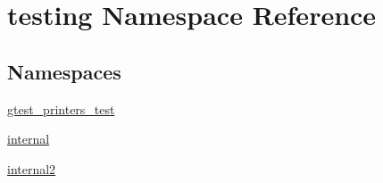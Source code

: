 \hypertarget{namespacetesting}{\section{testing Namespace Reference}
\label{namespacetesting}
}
\subsection*{Namespaces}
\begin{DoxyCompactItemize}
\item 
\hyperlink{namespacetesting_1_1gtest__printers__test}{gtest\-\_\-printers\-\_\-test}
\item 
\hyperlink{namespacetesting_1_1internal}{internal}
\item 
\hyperlink{namespacetesting_1_1internal2}{internal2}
\end{DoxyCompactItemize}
